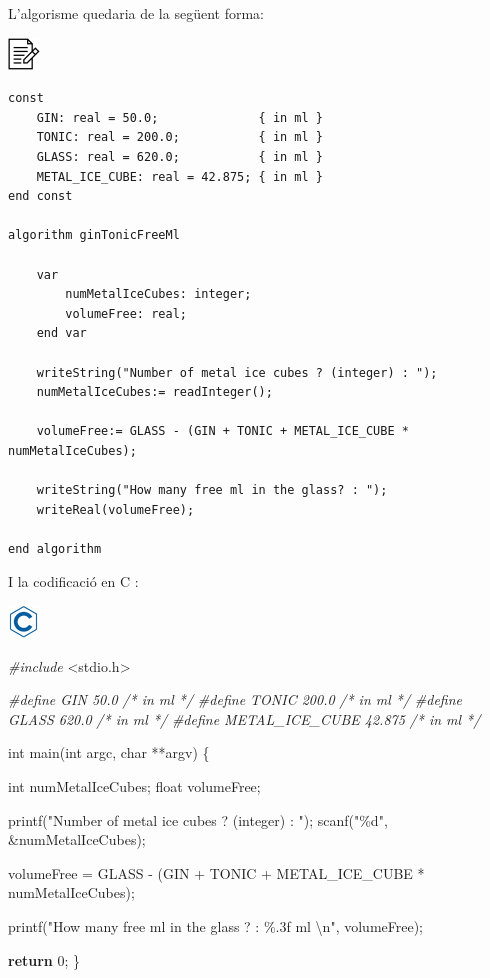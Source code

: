\documentclass[]{book}
\newenvironment{Shaded}{\begin{snugshade}}{\end{snugshade}}
\newcommand{\CommentTok}[1]{\textcolor[rgb]{0.56,0.35,0.01}{\textit{#1}}}
\newcommand{\ControlFlowTok}[1]{\textcolor[rgb]{0.13,0.29,0.53}{\textbf{#1}}}
\newcommand{\DataTypeTok}[1]{\textcolor[rgb]{0.13,0.29,0.53}{#1}}
\newcommand{\DecValTok}[1]{\textcolor[rgb]{0.00,0.00,0.81}{#1}}
\newcommand{\ImportTok}[1]{#1}
\newcommand{\NormalTok}[1]{#1}
\newcommand{\PreprocessorTok}[1]{\textcolor[rgb]{0.56,0.35,0.01}{\textit{#1}}}
\newcommand{\SpecialCharTok}[1]{\textcolor[rgb]{0.00,0.00,0.00}{#1}}
\newcommand{\StringTok}[1]{\textcolor[rgb]{0.31,0.60,0.02}{#1}}
\begin{document}
L'algorisme quedaria de la següent forma:

\includegraphics{./img/alg.png}

\begin{verbatim}
const
    GIN: real = 50.0;              { in ml }
    TONIC: real = 200.0;           { in ml }
    GLASS: real = 620.0;           { in ml }
    METAL_ICE_CUBE: real = 42.875; { in ml }
end const

algorithm ginTonicFreeMl

    var
        numMetalIceCubes: integer;
        volumeFree: real;
    end var

    writeString("Number of metal ice cubes ? (integer) : ");
    numMetalIceCubes:= readInteger();

    volumeFree:= GLASS - (GIN + TONIC + METAL_ICE_CUBE * numMetalIceCubes);

    writeString("How many free ml in the glass? : ");
    writeReal(volumeFree);

end algorithm
\end{verbatim}

I la codificació en C :

\includegraphics{./img/c.png}

\begin{Shaded}
\begin{Highlighting}[]
\PreprocessorTok{\#include }\ImportTok{\textless{}stdio.h\textgreater{}}

\PreprocessorTok{\#define GIN 50.0              }\CommentTok{/* in ml */}
\PreprocessorTok{\#define TONIC 200.0           }\CommentTok{/* in ml */}
\PreprocessorTok{\#define GLASS 620.0           }\CommentTok{/* in ml */}
\PreprocessorTok{\#define METAL\_ICE\_CUBE 42.875 }\CommentTok{/* in ml */}

\DataTypeTok{int}\NormalTok{ main(}\DataTypeTok{int}\NormalTok{ argc, }\DataTypeTok{char}\NormalTok{ **argv) \{}

    \DataTypeTok{int}\NormalTok{ numMetalIceCubes;}
    \DataTypeTok{float}\NormalTok{ volumeFree;}

\NormalTok{    printf(}\StringTok{"Number of metal ice cubes ? (integer) : "}\NormalTok{);}
\NormalTok{    scanf(}\StringTok{"\%d"}\NormalTok{, \&numMetalIceCubes);}

\NormalTok{    volumeFree = GLASS {-} (GIN + TONIC + METAL\_ICE\_CUBE * numMetalIceCubes);}

\NormalTok{    printf(}\StringTok{"How many free ml in the glass ? : \%.3f ml }\SpecialCharTok{\textbackslash{}n}\StringTok{"}\NormalTok{, volumeFree);}
    
    \ControlFlowTok{return} \DecValTok{0}\NormalTok{;}
\NormalTok{\}}
\end{Highlighting}
\end{Shaded}
\end{document}
